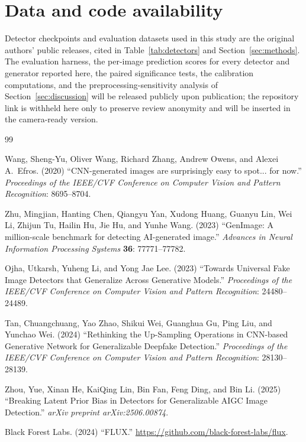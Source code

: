 \documentclass[3p,times,procedia]{elsarticle}
\begin{document}
\appendix
\section{Data and code availability}
Detector checkpoints and evaluation datasets used in this study are the
original authors' public releases, cited in Table~\ref{tab:detectors} and
Section~\ref{sec:methods}. The evaluation harness, the per-image prediction
scores for every detector and generator reported here, the paired
significance tests, the calibration computations, and the
preprocessing-sensitivity analysis of Section~\ref{sec:discussion} will be
released publicly upon publication; the repository link is withheld here
only to preserve review anonymity and will be inserted in the
camera-ready version.

\begin{thebibliography}{99}

Wang, Sheng-Yu, Oliver Wang, Richard Zhang, Andrew Owens, and Alexei A.\ Efros.
(2020) ``CNN-generated images are surprisingly easy to spot... for now.''
\textit{Proceedings of the IEEE/CVF Conference on Computer Vision and
Pattern Recognition}: 8695--8704.

Zhu, Mingjian, Hanting Chen, Qiangyu Yan, Xudong Huang, Guanyu Lin, Wei Li,
Zhijun Tu, Hailin Hu, Jie Hu, and Yunhe Wang. (2023) ``GenImage: A
million-scale benchmark for detecting AI-generated image.''
\textit{Advances in Neural Information Processing Systems} \textbf{36}:
77771--77782.

Ojha, Utkarsh, Yuheng Li, and Yong Jae Lee. (2023) ``Towards Universal Fake
Image Detectors that Generalize Across Generative Models.''
\textit{Proceedings of the IEEE/CVF Conference on Computer Vision and
Pattern Recognition}: 24480--24489.

Tan, Chuangchuang, Yao Zhao, Shikui Wei, Guanghua Gu, Ping Liu, and Yunchao
Wei. (2024) ``Rethinking the Up-Sampling Operations in CNN-based
Generative Network for Generalizable Deepfake Detection.''
\textit{Proceedings of the IEEE/CVF Conference on Computer Vision and
Pattern Recognition}: 28130--28139.

Zhou, Yue, Xinan He, KaiQing Lin, Bin Fan, Feng Ding, and Bin Li. (2025)
``Breaking Latent Prior Bias in Detectors for Generalizable AIGC Image
Detection.'' \textit{arXiv preprint arXiv:2506.00874}.

Black Forest Labs. (2024) ``FLUX.'' \url{https://github.com/black-forest-labs/flux}.


\end{thebibliography}
\end{document}
